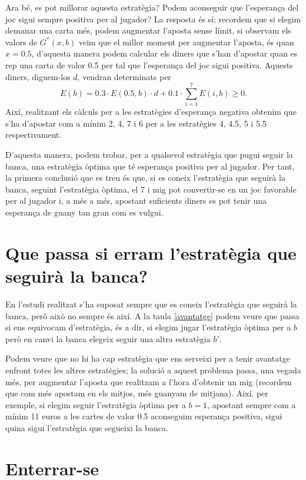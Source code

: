 \documentclass[9pt]{IEEEtran}
\begin{document}
Ara bé, es pot millorar aquesta estratègia? Podem aconseguir que l'esperança del joc sigui sempre positiva per al jugador? La resposta és sí; recordem que si elegim demanar una carta més, podem augmentar l'aposta sense límit, si observam els valors de $G^*(x,b)$ veim que el millor moment per augmentar l'aposta, és quan $x = 0.5$, d'aquesta manera podem calcular els diners que s'han d'apostar quan es rep una carta de valor 0.5 per tal que l'esperança del joc sigui positiva. Aquests diners, diguem-los $d$, vendran determinats per 
$$E(b) = 0.3 \cdot E(0.5,b) \cdot d + 0.1 \cdot \sum_{i=1}^7 E(i,b) \geq 0.$$
Així, realitzant els càlculs per a les estratègies d'esperança negativa obtenim que s'ha d'apostar  com a mínim 2, 4, 7 i 6 per a les estratègies 4, 4.5, 5 i 5.5 respectivament.


D'aquesta manera, podem trobar, per a qualsevol estratègia que pugui seguir la banca, una estratègia òptima que té esperança positiva per al jugador. Per tant, la primera conclusió que es treu és que, si es coneix l'estratègia que seguirà la banca, seguint l'estratègia òptima, el 7 i mig pot convertir-se en un joc favorable per al jugador i, a més a més, apostant suficients diners es pot tenir una esperança de guany tan gran com es vulgui.

\section{Que passa si erram l'estratègia que seguirà la banca?}

En l'estudi realitzat s'ha suposat sempre que es coneix l'estratègia que seguirà la banca, però això no sempre és així. A la taula \ref{avantatge} podem veure que passa si ens equivocam d'estratègia, és a dir, si elegim jugar l'estratègia òptima per a $b$ però en canvi la banca elegeix seguir una altra estratègia $b'$.



Podem veure que no hi ha cap estratègia que ens serveixi per a tenir avantatge enfront totes les altres estratègies; la solució a aquest problema passa, una vegada més, per augmentar l'aposta que realitzam a l'hora d'obtenir un mig (recordem que com més apostam en els mitjos, més guanyam de mitjana). Així, per exemple, si elegim seguir l'estratègia òptima per a $b=1$, apostant sempre com a mínim 11 euros a les cartes de valor 0.5 aconseguim esperança positiva, sigui quina sigui l'estratègia que segueixi la banca.


\section{Enterrar-se}
\end{document}
